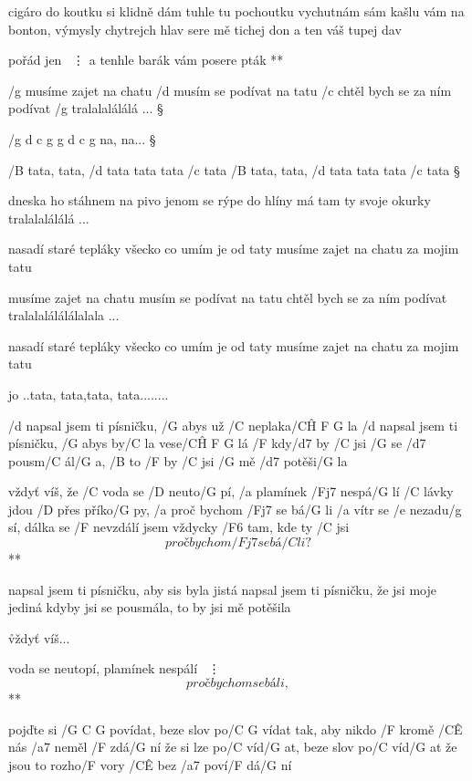 cigáro do koutku si klidně dám
tuhle tu pochoutku vychutnám sám
kašlu vám na bonton, výmysly chytrejch hlav
sere mě tichej don a ten váš tupej dav

\R  pořád jen
    \ \vdots
    a tenhle barák vám posere pták **




/g musíme zajet na chatu
/d musím se podívat na tatu
/c chtěl bych se za ním podívat
/g tralalalálálá ... \S

/{g d c g g d c g} na, na... \S

/B tata, tata, /d tata tata tata /c tata 
/B tata, tata, /d tata tata tata /c tata \S

dneska ho stáhnem na pivo
jenom se rýpe do hlíny
má tam ty svoje okurky
tralalalálálá ... \s

nasadí staré tepláky
všecko co umím je od taty
musíme zajet na chatu
za mojim tatu \s

musíme zajet na chatu
musím se podívat na tatu
chtěl bych se za ním podívat
tralalalálálálalala ... \s

nasadí staré tepláky
všecko co umím je od taty
musíme zajet na chatu
za mojim tatu \s

jo ..tata, tata,tata, tata........




/d napsal jsem ti písničku, /G abys už /C neplaka/{C\^H F G} la
/d napsal jsem ti písničku, /G abys by/C la vese/{C\^H F G} lá
/F kdy/d7 by  /C jsi /G se /d7 pousm/C ál/G a, /B to /F by /C jsi /G mě /d7 potěši/G la

\R  vždyť víš, že /C voda se /D neuto/G pí, /a plamínek /Fj7 nespá/G lí
    /C lávky jdou /D přes příko/G py, /a proč bychom /Fj7 se  bá/G li
    /a vítr se /e nezadu/g sí, dálka se /F nevzdálí
    jsem vždycky /F6 tam, kde ty /C jsi
    \[ proč bychom /Fj7 se bá/C li? \] **

napsal jsem ti písničku, aby sis byla jistá
napsal jsem ti písničku, že jsi moje jediná
kdyby jsi se pousmála, to by jsi mě potěšila

\r vždyť víš...

\R  voda se neutopí, plamínek nespálí
    \ \vdots
    \[ proč bychom se báli, \]  **




pojďte si /{G C G} povídat, beze slov po/{C G} vídat
tak, aby nikdo /F kromě /C\^E nás /a7 neměl /F zdá/G ní
že si lze po/C víd/G at, beze slov po/C víd/G at
že jsou to rozho/F vory /C\^E bez /a7 poví/F dá/G ní

